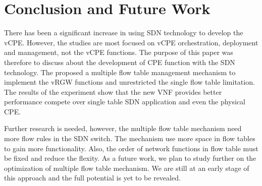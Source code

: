 \chapter{Conclusion and Future Work} \label{ch:conclusion}

There has been a significant increase in using SDN technology to develop the vCPE. However, the studies are most focused on vCPE orchestration, deployment and management, not the vCPE functions. The purpose of this paper was therefore to discuss about the development of CPE function with the SDN technology. The proposed a multiple flow table management mechanism to implement the vRGW functions and unrestricted the single flow table limitation. The results of the experiment show that the new VNF provides better performance compete over single table SDN application and even the physical CPE.

Further research is needed, however, the multiple flow table mechanism need more flow rules in the SDN switch. The mechanism use more space in flow tables to gain more functionality. Also, the order of network functions in flow table must be fixed and reduce the flexity. As a future work, we plan to study further on the optimization of multiple flow table mechanism. We are still at an early stage of this approach and the full potential is yet to be revealed.
